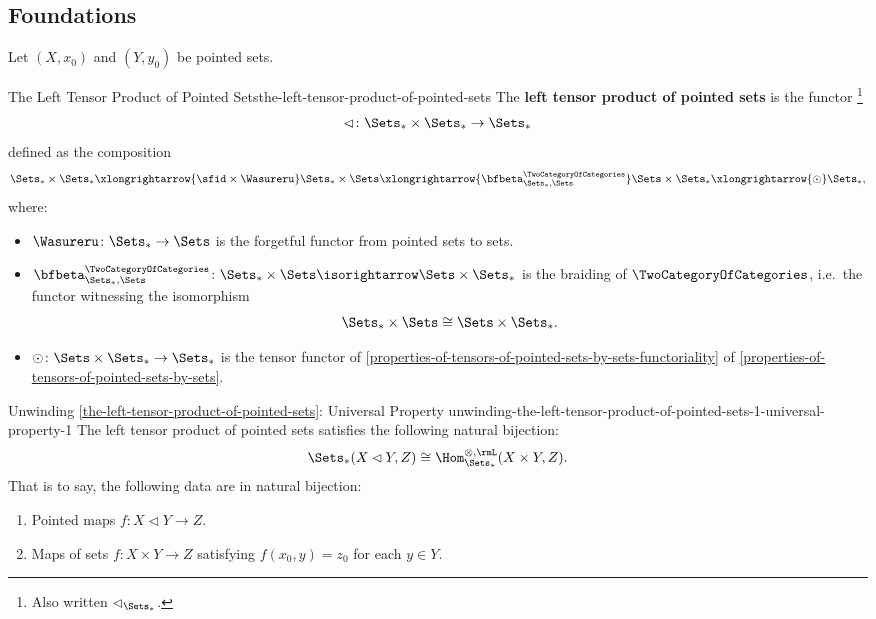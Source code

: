\subsection{Foundations}\label{subsection-the-left-tensor-product-of-pointed-sets-foundations}
Let $(X,x_{0})$ and $(Y,y_{0})$ be pointed sets.
\begin{definition}{The Left Tensor Product of Pointed Sets}{the-left-tensor-product-of-pointed-sets}%
    The \textbf{left tensor product of pointed sets} is the functor%
    \footnote{%
        Also written $\lhd_{\Sets_{*}}$.
        \par\vspace*{\TCBBoxCorrection}
    }%
    \[
        \lhd%
        \colon%
        \Sets_{*}\times\Sets_{*}%
        \to%
        \Sets_{*}%
    \]%
    defined as the composition
    \[
        \Sets_{*}\times\Sets_{*}%
        \xlongrightarrow{\sfid\times\Wasureru}%
        \Sets_{*}\times\Sets%
        \xlongrightarrow{\bfbeta^{\TwoCategoryOfCategories}_{\Sets_{*},\Sets}}%
        \Sets\times\Sets_{*}%
        \xlongrightarrow{\odot}%
        \Sets_{*},%
    \]%
    where:
    \begin{itemize}
        \item $\Wasureru\colon\Sets_{*}\to\Sets$ is the forgetful functor from pointed sets to sets.
        \item ${\bfbeta^{\TwoCategoryOfCategories}_{\Sets_{*},\Sets}}\colon\Sets_{*}\times\Sets\isorightarrow\Sets\times\Sets_{*}$ is the braiding of $\TwoCategoryOfCategories$, i.e.\ the functor witnessing the isomorphism%
            \[
                \Sets_{*}\times\Sets%
                \cong%
                \Sets\times\Sets_{*}.%
            \]%
        \item $\odot\colon\Sets\times\Sets_{*}\to\Sets_{*}$ is the tensor functor of \cref{properties-of-tensors-of-pointed-sets-by-sets-functoriality} of \cref{properties-of-tensors-of-pointed-sets-by-sets}.%
    \end{itemize}
\end{definition}
\begin{remark}{Unwinding \cref{the-left-tensor-product-of-pointed-sets}: Universal Property \rmI}{unwinding-the-left-tensor-product-of-pointed-sets-1-universal-property-1}%
    The left tensor product of pointed sets satisfies the following natural bijection:%
    \[%
        \Sets_{*}(X\lhd Y,Z)%
        \cong%
        \Hom^{\otimes,\rmL}_{\Sets_{*}}(X\times Y,Z).
    \]%
    That is to say, the following data are in natural bijection:
    \begin{enumerate}
        \item\label{unwinding-the-left-tensor-product-of-pointed-sets-1-universal-property-1-item-1}Pointed maps $f\colon X\lhd Y\to Z$.
        \item\label{unwinding-the-left-tensor-product-of-pointed-sets-1-universal-property-1-item-2}Maps of sets $f\colon X\times Y\to Z$ satisfying $f(x_{0},y)=z_{0}$ for each $y\in Y$.
    \end{enumerate}
\end{remark}
